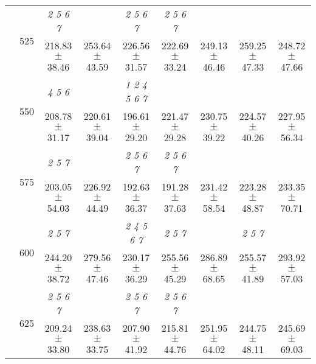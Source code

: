 \begin{table}[h]
{\begin{tabular}{
        ccccccccc}
 & \multirow{2}{*}{525}& \cellcolor[HTML]{EFEFEF} \textit{ 2 5 6 7 }& \cellcolor[HTML]{EFEFEF} & \cellcolor[HTML]{EFEFEF} \textit{ 2 5 6 7 }& \cellcolor[HTML]{EFEFEF} \textit{ 2 5 6 7 }& \cellcolor[HTML]{EFEFEF} & \cellcolor[HTML]{EFEFEF} & \cellcolor[HTML]{EFEFEF}  \\ 
 & & \cellcolor[HTML]{EFEFEF} 218.83 $\pm$ 38.46& \cellcolor[HTML]{EFEFEF} 253.64 $\pm$ 43.59& \cellcolor[HTML]{EFEFEF} 226.56 $\pm$ 31.57& \cellcolor[HTML]{EFEFEF} 222.69 $\pm$ 33.24& \cellcolor[HTML]{EFEFEF} 249.13 $\pm$ 46.46& \cellcolor[HTML]{EFEFEF} 259.25 $\pm$ 47.33& \cellcolor[HTML]{EFEFEF} 248.72 $\pm$ 47.66 \\ 
 & \multirow{2}{*}{550}& \textit{ 4 5 6 }& & \textit{ 1 2 4 5 6 7 }& & & &  \\ 
 & & 208.78 $\pm$ 31.17& 220.61 $\pm$ 39.04& 196.61 $\pm$ 29.20& 221.47 $\pm$ 29.28& 230.75 $\pm$ 39.22& 224.57 $\pm$ 40.26& 227.95 $\pm$ 56.34 \\ 
 & \multirow{2}{*}{575}& \cellcolor[HTML]{EFEFEF} \textit{ 2 5 7 }& \cellcolor[HTML]{EFEFEF} & \cellcolor[HTML]{EFEFEF} \textit{ 2 5 6 7 }& \cellcolor[HTML]{EFEFEF} \textit{ 2 5 6 7 }& \cellcolor[HTML]{EFEFEF} & \cellcolor[HTML]{EFEFEF} & \cellcolor[HTML]{EFEFEF}  \\ 
 & & \cellcolor[HTML]{EFEFEF} 203.05 $\pm$ 54.03& \cellcolor[HTML]{EFEFEF} 226.92 $\pm$ 44.49& \cellcolor[HTML]{EFEFEF} 192.63 $\pm$ 36.37& \cellcolor[HTML]{EFEFEF} 191.28 $\pm$ 37.63& \cellcolor[HTML]{EFEFEF} 231.42 $\pm$ 58.54& \cellcolor[HTML]{EFEFEF} 223.28 $\pm$ 48.87& \cellcolor[HTML]{EFEFEF} 233.35 $\pm$ 70.71 \\ 
 & \multirow{2}{*}{600}& \textit{ 2 5 7 }& & \textit{ 2 4 5 6 7 }& \textit{ 2 5 7 }& & \textit{ 2 5 7 }&  \\ 
 & & 244.20 $\pm$ 38.72& 279.56 $\pm$ 47.46& 230.17 $\pm$ 36.29& 255.56 $\pm$ 45.29& 286.89 $\pm$ 68.65& 255.57 $\pm$ 41.89& 293.92 $\pm$ 57.03 \\ 
 & \multirow{2}{*}{625}& \cellcolor[HTML]{EFEFEF} \textit{ 2 5 6 7 }& \cellcolor[HTML]{EFEFEF} & \cellcolor[HTML]{EFEFEF} \textit{ 2 5 6 7 }& \cellcolor[HTML]{EFEFEF} \textit{ 2 5 6 7 }& \cellcolor[HTML]{EFEFEF} & \cellcolor[HTML]{EFEFEF} & \cellcolor[HTML]{EFEFEF}  \\ 
 & & \cellcolor[HTML]{EFEFEF} 209.24 $\pm$ 33.80& \cellcolor[HTML]{EFEFEF} 238.63 $\pm$ 33.75& \cellcolor[HTML]{EFEFEF} 207.90 $\pm$ 41.92& \cellcolor[HTML]{EFEFEF} 215.81 $\pm$ 44.76& \cellcolor[HTML]{EFEFEF} 251.95 $\pm$ 64.02& \cellcolor[HTML]{EFEFEF} 244.75 $\pm$ 48.11& \cellcolor[HTML]{EFEFEF} 245.69 $\pm$ 69.03 \\ 

\end{tabular}}
\end{table}
